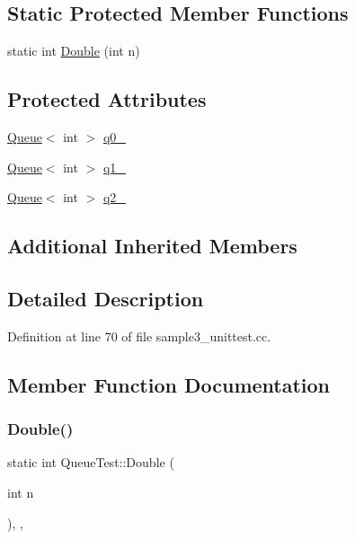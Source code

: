 \subsection*{Static Protected Member Functions}
\begin{DoxyCompactItemize}
\item 
static int \hyperlink{classQueueTest_a2c7e0d1edb558dbbc4c085316d3d1ee6}{Double} (int n)
\end{DoxyCompactItemize}
\subsection*{Protected Attributes}
\begin{DoxyCompactItemize}
\item 
\hyperlink{classQueue}{Queue}$<$ int $>$ \hyperlink{classQueueTest_a0eba1fe2b31d75abd2df688ca5245e22}{q0\+\_\+}
\item 
\hyperlink{classQueue}{Queue}$<$ int $>$ \hyperlink{classQueueTest_a1e55594e71820ba0f1b09591fb328c30}{q1\+\_\+}
\item 
\hyperlink{classQueue}{Queue}$<$ int $>$ \hyperlink{classQueueTest_aeb7a2e3f6ce2d97d84eb1e01468adc2f}{q2\+\_\+}
\end{DoxyCompactItemize}
\subsection*{Additional Inherited Members}


\subsection{Detailed Description}


Definition at line 70 of file sample3\+\_\+unittest.\+cc.



\subsection{Member Function Documentation}
\mbox{\label{classQueueTest_a2c7e0d1edb558dbbc4c085316d3d1ee6}} 
\subsubsection{\texorpdfstring{Double()}{Double()}}
{\footnotesize\ttfamily static int Queue\+Test\+::\+Double (\begin{DoxyParamCaption}\item[{int}]{n }\end{DoxyParamCaption})\hspace{0.3cm}{\ttfamily [inline]}, {\ttfamily [static]}, {\ttfamily [protected]}}



